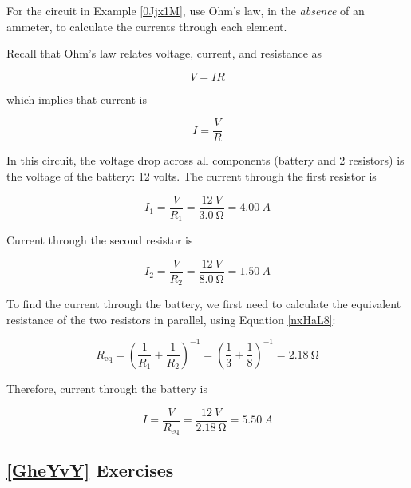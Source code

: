 \documentclass[dvipsnames]{article}
\numberwithin{equation}{section}
\numberwithin{figure}{section}
\begin{document}
\vspace{1em}

\cyanhrule

\begin{example}
    For the circuit in Example \ref{0Jjx1M}, use Ohm's law, in the \textit{absence} of an ammeter, to calculate the currents through each element.
\end{example}

\Solution Recall that Ohm's law relates voltage, current, and resistance as

\begin{equation*}
    V = I R
\end{equation*}

which implies that current is

\begin{equation*}
    I = \frac{V}{R}
\end{equation*}

In this circuit, the voltage drop across all components (battery and 2 resistors) is the voltage of the battery: 12 volts. The current through the first resistor is

\begin{equation*}
        I_1 = \frac{V}{R_1} = \frac{\SI{12}{V}}{\SI{3.0}{\ohm}} =  \SI{4.00}{A}
\end{equation*}

Current through the second resistor is

\begin{equation*}
    I_2 = \frac{V}{R_2} = \frac{\SI{12}{V}}{\SI{8.0}{\ohm}} = \SI{1.50}{A}
\end{equation*}

To find the current through the battery, we first need to calculate the equivalent resistance of the two resistors in parallel, using Equation \ref{nxHaL8}:

\begin{equation*}
    R_{\mathrm{eq}} = \left(\frac{1}{R_1} + \frac{1}{R_2}\right)^{-1} = \left(\frac{1}{3} + \frac{1}{8}\right)^{-1} = \SI{2.18}{\ohm}
\end{equation*}

Therefore, current through the battery is

\begin{equation*}
    I = \frac{V}{R_{\text{eq}}} = \frac{\SI{12}{V}}{\SI{2.18}{\ohm}} = \SI{5.50}{A}
\end{equation*}

\cyanhrule

\subsection*{\ref{GheYvY} Exercises}
\end{document}
